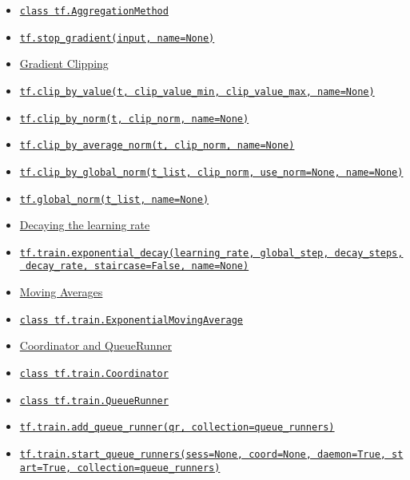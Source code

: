 \begin{itemize}
\item
  \protect\hyperlink{AggregationMethod}{\texttt{class\ tf.AggregationMethod}}
\item
  \protect\hyperlink{stopux5fgradient}{\texttt{tf.stop\_gradient(input,\ name=None)}}
\item
  \protect\hyperlink{AUTOGENERATED-gradient-clipping}{Gradient Clipping}
\item
  \protect\hyperlink{clipux5fbyux5fvalue}{\texttt{tf.clip\_by\_value(t,\ clip\_value\_min,\ clip\_value\_max,\ name=None)}}
\item
  \protect\hyperlink{clipux5fbyux5fnorm}{\texttt{tf.clip\_by\_norm(t,\ clip\_norm,\ name=None)}}
\item
  \protect\hyperlink{clipux5fbyux5faverageux5fnorm}{\texttt{tf.clip\_by\_average\_norm(t,\ clip\_norm,\ name=None)}}
\item
  \protect\hyperlink{clipux5fbyux5fglobalux5fnorm}{\texttt{tf.clip\_by\_global\_norm(t\_list,\ clip\_norm,\ use\_norm=None,\ name=None)}}
\item
  \protect\hyperlink{globalux5fnorm}{\texttt{tf.global\_norm(t\_list,\ name=None)}}
\item
  \protect\hyperlink{AUTOGENERATED-decaying-the-learning-rate}{Decaying
  the learning rate}
\item
  \protect\hyperlink{exponentialux5fdecay}{\texttt{tf.train.exponential\_decay(learning\_rate,\ global\_step,\ decay\_steps,\ decay\_rate,\ staircase=False,\ name=None)}}
\item
  \protect\hyperlink{AUTOGENERATED-moving-averages}{Moving Averages}
\item
  \protect\hyperlink{ExponentialMovingAverage}{\texttt{class\ tf.train.ExponentialMovingAverage}}
\item
  \protect\hyperlink{AUTOGENERATED-coordinator-and-queuerunner}{Coordinator
  and QueueRunner}
\item
  \protect\hyperlink{Coordinator}{\texttt{class\ tf.train.Coordinator}}
\item
  \protect\hyperlink{QueueRunner}{\texttt{class\ tf.train.QueueRunner}}
\item
  \protect\hyperlink{addux5fqueueux5frunner}{\texttt{tf.train.add\_queue\_runner(qr,\ collection=\textquotesingle{}queue\_runners\textquotesingle{})}}
\item
  \protect\hyperlink{startux5fqueueux5frunners}{\texttt{tf.train.start\_queue\_runners(sess=None,\ coord=None,\ daemon=True,\ start=True,\ collection=\textquotesingle{}queue\_runners\textquotesingle{})}}

\end{itemize}
